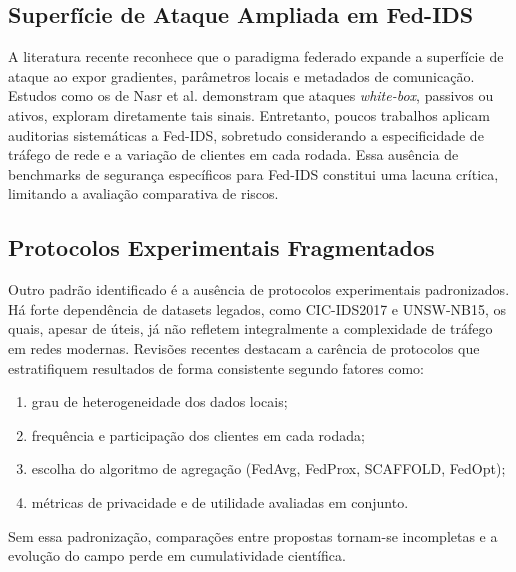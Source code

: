 \documentclass[
	12pt,				%
	openright,			%
	oneside,			%
	a4paper,			%
	english,			%
	french,				%
	spanish,			%
	brazil,				%
	]{abntex2}
\begin{document}
\subsection{Superfície de Ataque Ampliada em Fed-IDS}
A literatura recente reconhece que o paradigma federado expande a superfície de ataque ao expor gradientes, parâmetros locais e metadados de comunicação. Estudos como os de Nasr et al. \cite{nasr2019comprehensive} demonstram que ataques \textit{white-box}, passivos ou ativos, exploram diretamente tais sinais. Entretanto, poucos trabalhos aplicam auditorias sistemáticas a Fed-IDS, sobretudo considerando a especificidade de tráfego de rede e a variação de clientes em cada rodada. Essa ausência de benchmarks de segurança específicos para Fed-IDS constitui uma lacuna crítica, limitando a avaliação comparativa de riscos.

\subsection{Protocolos Experimentais Fragmentados}
Outro padrão identificado é a ausência de protocolos experimentais padronizados. Há forte dependência de datasets legados, como CIC-IDS2017 e UNSW-NB15, os quais, apesar de úteis, já não refletem integralmente a complexidade de tráfego em redes modernas. Revisões recentes \cite{belenguer2025surveyfedids} destacam a carência de protocolos que estratifiquem resultados de forma consistente segundo fatores como:
\begin{enumerate}[label=(\alph*)]
    \item grau de heterogeneidade dos dados locais;
    \item frequência e participação dos clientes em cada rodada;
    \item escolha do algoritmo de agregação (FedAvg, FedProx, SCAFFOLD, FedOpt);
    \item métricas de privacidade e de utilidade avaliadas em conjunto.
\end{enumerate}
Sem essa padronização, comparações entre propostas tornam-se incompletas e a evolução do campo perde em cumulatividade científica.
\end{document}
